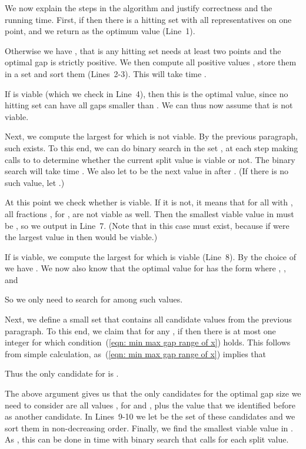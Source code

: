 \bigskip

We now explain the steps in the algorithm and justify correctness and the running time.
First, if  then there is a hitting set with all representatives on one point, 
and we return  as the optimum value (Line~1).

Otherwise we have , that is any hitting set needs at least two points and 
the optimal gap is strictly positive. 
We then compute all positive values , store them in a set  and sort them (Lines~2-3).
This will take time .

If  is viable (which we check in Line~4), 
then this is the optimal value, since no hitting set can have all
gaps smaller than . 
We can thus now assume that  is not viable.

Next, we compute the largest  for which  is not viable. By the
previous paragraph, such  exists. 
To this end, we can do binary search in the set ,
at each step making calls to  to
determine whether the current split value is viable or not.
The binary search will take time . 
We also let  to be the next value in  after . (If there is no such value, let .)

At this point we check whether  is viable. If it is not, it means that for all  with
, all fractions , for , are not viable as well. 
Then the smallest viable value in  must be , so we output  in Line~7. 
(Note that in this case  must exist, because if  were the largest value in 
then  would be viable.)

If  is viable, we compute the largest  for which  is viable (Line~8). By the choice of  we have
. We now also know that the optimal value for  has the form 
where , , and

So we only need to search for  among such values.

Next, we define a small set  that contains all candidate values from the previous paragraph.
To this end, we claim that for any , if  then there is at most one integer
 for which condition~(\ref{eqn: min max gap range of x}) holds. 
This follows from simple calculation, as~(\ref{eqn: min max gap range of x}) implies that

Thus the only candidate for  is .

The above argument gives us that the only candidates for the optimal gap size we need to consider
are all values  , for  and , plus the value  that we identified before
as another candidate.
In Lines~9-10 we let  be the set of these candidates and we sort them in non-decreasing order.
Finally, we find the smallest viable value in . 
As , this can be done in time  with binary search that calls  for each split value.




